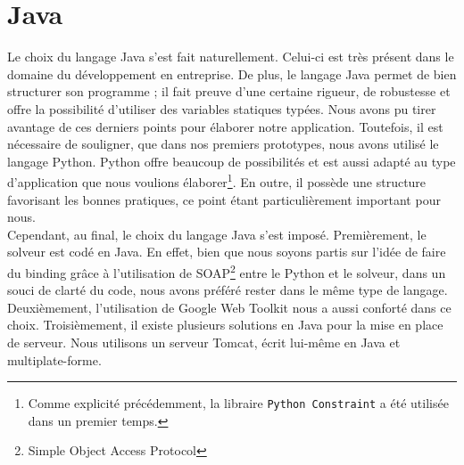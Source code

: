 \section{Java}
Le choix du langage Java s'est fait naturellement. Celui-ci est très présent
dans le domaine du développement en entreprise. De plus, le langage Java permet de bien
structurer son programme ; il fait preuve d'une certaine rigueur, de robustesse
et offre la possibilité d'utiliser des variables statiques typées. Nous avons pu
tirer avantage de ces derniers points pour élaborer notre application.
\newline
\indent
Toutefois, il est nécessaire de souligner, que dans nos premiers prototypes, nous avons utilisé le langage Python. Python offre beaucoup de possibilités et est aussi adapté
au type d'application que nous voulions élaborer\footnote{Comme explicité précédemment, la libraire \texttt{Python Constraint} a été utilisée dans un premier temps.}. En outre, il possède une structure
favorisant les bonnes pratiques, ce point étant particulièrement important pour
nous.\\
\newline
\indent
Cependant, au final, le choix du langage Java s'est imposé. Premièrement, le solveur est codé en Java. En effet, bien que nous soyons partis sur l'idée de faire du binding grâce à l'utilisation de SOAP\footnote{Simple Object Access Protocol} entre le Python et le solveur, dans un souci de clarté du code, nous avons préféré rester dans le même type de langage.
Deuxièmement, l'utilisation de Google Web Toolkit nous a aussi conforté dans ce choix.
Troisièmement, il existe plusieurs solutions en Java pour la mise en place de serveur. Nous utilisons un serveur Tomcat, écrit lui-même en Java et multiplate-forme. 






